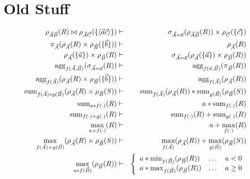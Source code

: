 


\section{Old Stuff}






\begin{figure*}
\begin{eqnarray}
\rho_{\vec{A}\vec{B}}(R) \bowtie \rho_{\vec{A}\vec{C}}(\{ \tuple{\vec{a}\vec{c}} \})
&\vdash&
\sigma_{\vec{A}=\vec{a}}(\rho_{\vec{A}\vec{B}}(R)) \times \rho_{\vec{C}}(\{ \vec{c} \})
\label{r1}
\\
\pi_{\vec{A}}(\rho_{\vec{A}}(R) \times \rho_{\vec{B}}(\{ \vec{b} \}))
&\vdash&
\rho_{\vec{A}}(R)
\label{r2}
\\
\rho_{\vec{A}}(\{\vec{a}\}) \times \rho_{\vec{B}}(R)
&\vdash&
\sigma_{\vec{A}=\vec{a}}(\rho_{\vec{A}}(\{\vec{a}\}) \times \rho_{\vec{B}}(R))
\label{r3}
\\
\algagg_{f(\vec{A},\vec{B})}(\sigma_{\vec{A}=\vec{a}}(R))
&\vdash&
\algagg_{f(\vec{a},\vec{B})}(\pi_{\vec{B}}(R))
\label{r4}
\\
\algagg_{f(\vec{A})}(\rho_{\vec{A}}(R) \times \rho_{\vec{B}}(\{\vec{b}\}))
&\vdash&
\algagg_{f(\vec{A})}(\rho_{\vec{A}}(R))
\label{r5}
\\
\algsum_{f(\vec{A}) * g(\vec{B})}(\rho_{\vec{A}}(R) \times \rho_{\vec{B}}(S))
&\vdash&
\algsum_{f(\vec{A})}(\rho_{\vec{A}}(R)) *
\algsum_{g(\vec{B})}(\rho_{\vec{B}}(S))
\label{r6}
\\
\algsum_{a *
f(\cdot)}(R) &\vdash& a * \algsum_{f(\cdot)}(R)
\label{r7}
\\
\algsum_{f(\cdot) + g(\cdot)}(R)
&\vdash&
\algsum_{f(\cdot)}(R) + \algsum_{g(\cdot)}(R)
\label{r8}
\\
\max_{a + f(\cdot)}(R)
&\vdash&
a + \max_{f(\cdot)}(R)
\label{r9}
\\
\max_{f(\vec{A}) + g(\vec{B})}(\rho_{\vec{A}}(R) \times \rho_{\vec{B}}(S))
&\vdash&
\max_{f(\vec{A})}(\rho_{\vec{A}}(R)) +
\max_{g(\vec{B})}(\rho_{\vec{B}}(S))
\label{r10}
\\
\max_{a * f(\vec{B})}(\rho_{\vec{B}}(R))
&\vdash&
\left\{
\begin{array}{lll}
a * \min_{f(\vec{B})}(\rho_{\vec{B}}(R)) & \dots & a < 0 \\
a * \max_{f(\vec{B})}(\rho_{\vec{B}}(R)) & \dots & a \geq 0
\end{array}
\right.

\end{eqnarray}
\end{figure*}
